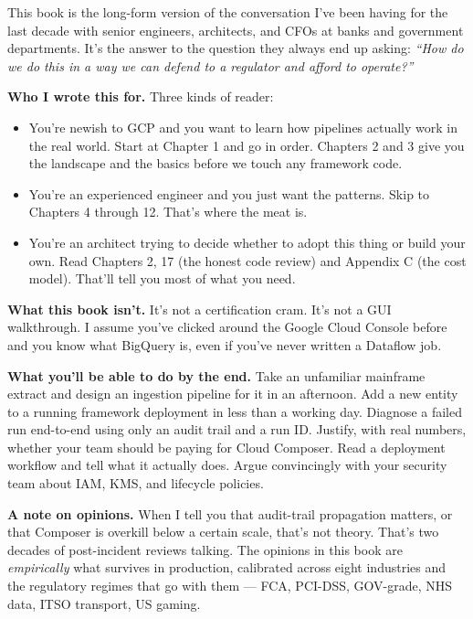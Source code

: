 \documentclass[
  11pt,
  british,
  oneside]{book}
\providecommand{\tightlist}{%
  \setlength{\itemsep}{0pt}\setlength{\parskip}{0pt}}
\begin{document}
This book is the long-form version of the conversation I've been having
for the last decade with senior engineers, architects, and CFOs at banks
and government departments. It's the answer to the question they always
end up asking: \emph{``How do we do this in a way we can defend to a
regulator and afford to operate?''}

\textbf{Who I wrote this for.} Three kinds of reader:

\begin{itemize}
\tightlist
\item
  You're newish to GCP and you want to learn how pipelines actually work
  in the real world. Start at Chapter 1 and go in order. Chapters 2 and
  3 give you the landscape and the basics before we touch any framework
  code.
\item
  You're an experienced engineer and you just want the patterns. Skip to
  Chapters 4 through 12. That's where the meat is.
\item
  You're an architect trying to decide whether to adopt this thing or
  build your own. Read Chapters 2, 17 (the honest code review) and
  Appendix C (the cost model). That'll tell you most of what you need.
\end{itemize}

\textbf{What this book isn't.} It's not a certification cram. It's not a
GUI walkthrough. I assume you've clicked around the Google Cloud Console
before and you know what BigQuery is, even if you've never written a
Dataflow job.

\textbf{What you'll be able to do by the end.} Take an unfamiliar
mainframe extract and design an ingestion pipeline for it in an
afternoon. Add a new entity to a running framework deployment in less
than a working day. Diagnose a failed run end-to-end using only an audit
trail and a run ID. Justify, with real numbers, whether your team should
be paying for Cloud Composer. Read a deployment workflow and tell what
it actually does. Argue convincingly with your security team about IAM,
KMS, and lifecycle policies.

\textbf{A note on opinions.} When I tell you that audit-trail
propagation matters, or that Composer is overkill below a certain scale,
that's not theory. That's two decades of post-incident reviews talking.
The opinions in this book are \emph{empirically} what survives in
production, calibrated across eight industries and the regulatory
regimes that go with them --- FCA, PCI-DSS,
GOV-grade, NHS data, ITSO transport, US gaming.
\end{document}

